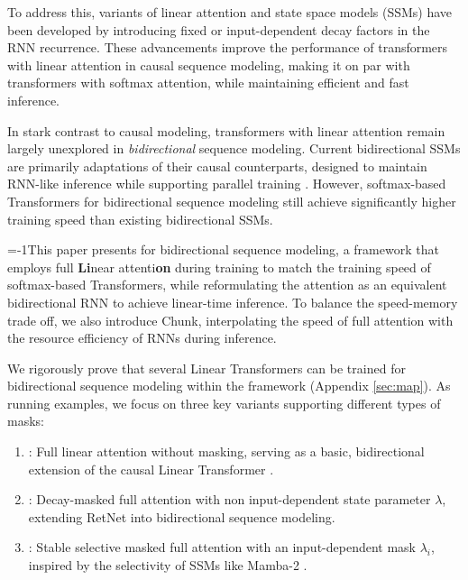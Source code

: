 To address this, variants of linear attention and state space models (SSMs) have been developed by introducing fixed \cite{retnet,peng2021random,gu2021efficiently} or input-dependent decay factors \cite{mamba,mamba2,yang2023gated} in the RNN recurrence. These advancements improve the performance of transformers with linear attention in causal sequence modeling, making it on par with transformers with softmax attention, while maintaining efficient and fast inference.

 In stark contrast to causal modeling, transformers with linear attention remain largely unexplored in \textit{bidirectional} sequence modeling. Current bidirectional SSMs are primarily adaptations of their causal counterparts, designed to maintain RNN-like inference while supporting parallel training \citep{zhu2024visionmambaefficientvisual,hwang2024hydrabidirectionalstatespace,deltanet,yang2023gated,mamba2}.
However, softmax-based Transformers for bidirectional sequence modeling \cite{vit,he2020deberta} still achieve significantly higher training speed than existing bidirectional SSMs.

\looseness=-1This paper presents \lion for bidirectional sequence modeling, a framework that employs full \textbf{Li}near attenti\textbf{on} during training to match the training speed of softmax-based Transformers, while reformulating the attention as an equivalent bidirectional RNN to achieve linear-time inference. To balance the speed-memory trade off,  we also introduce \lion Chunk, interpolating the speed of full attention with the resource efficiency of RNNs during inference.


We rigorously prove that several Linear Transformers can be trained for bidirectional sequence modeling within the \lion framework (Appendix \ref{sec:map}). 
 As running examples, we focus on three key variants supporting different types of masks:
\vspace{-3mm}
\begin{enumerate}
\itemsep0em 
    \item \colorbox{green!10}{\lionlit}: Full linear attention without masking, serving as a basic, bidirectional extension of the causal Linear Transformer \cite{trans_rnn}.  
    \item \colorbox{ violet!20}{\lionretnet}: Decay-masked full attention with non input-dependent state parameter $\lambda$, extending RetNet \cite{retnet} into bidirectional sequence modeling. \vspace{-2mm}
    \item \colorbox{orange!17}{\lions}: Stable selective masked full attention with an input-dependent mask $\lambda_i$, inspired by the selectivity of SSMs like Mamba-2 \cite{mamba2}.   \vspace{-2mm}
\end{enumerate}
\vspace{-1mm}

